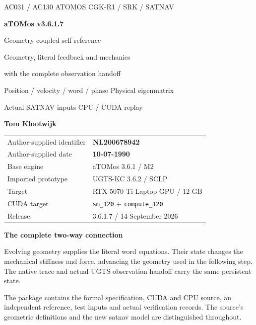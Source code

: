 \documentclass[11pt,a4paper]{article}
\newcommand{\code}[1]{\texttt{#1}}
\begin{document}
\begin{titlepage}
\thispagestyle{empty}
{\sffamily\color{accent}\large AC031 / AC130 ATOMOS \hfill CGK-R1 / SRK / SATNAV}\par
\vspace{20mm}
{\sffamily\bfseries\fontsize{54}{60}\selectfont\color{ink}aTOMos v3.6.1.7}\par
\vspace{9mm}
{\sffamily\fontsize{25}{31}\selectfont Geometry-coupled self-reference}\par
\vspace{5mm}
{\sffamily\fontsize{21}{28}\selectfont\color{gold}Geometry, literal feedback and mechanics\par
with the complete observation handoff}\par
\vspace{12mm}
{\large Position / velocity / word / phase \;\textperiodcentered\; Physical eigenmatrix\par
Actual SATNAV inputs \;\textperiodcentered\; CPU / CUDA replay}\par
\vspace{18mm}
{\sffamily\bfseries\Large Tom Klootwijk}\par
\begin{tabular}{@{}ll@{}}
Author-supplied identifier & \textbf{NL200678942}\\
Author-supplied date & \textbf{10-07-1990}\\
Base engine & aTOMos 3.6.1 / M2\\
Imported prototype & UGTS-KC 3.6.2 / SCLP\\
Target & RTX 5070 Ti Laptop GPU / 12 GB\\
CUDA target & \code{sm\_120} + \code{compute\_120}\\
Release & 3.6.1.7 / 14 September 2026\\
\end{tabular}
\vfill
\begin{panel}
\textbf{The complete two-way connection}\par
Evolving geometry supplies the literal word equations. Their state changes the
mechanical stiffness and force, advancing the geometry used in the following step.
The native trace and actual UGTS observation handoff carry the same persistent state.
\end{panel}
{\small\color{muted}The package contains the formal specification, CUDA and CPU source, an independent
reference, test inputs and actual verification records. The source's geometric definitions and the new
satnav model are distinguished throughout.}
\end{titlepage}
\setcounter{page}{2}
\end{document}
